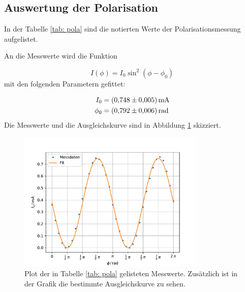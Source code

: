 \subsection{Auswertung der Polarisation}

In der Tabelle \ref{tab: pola} sind die notierten Werte der Polarisationsmessung
aufgelistet.
\FloatBarrier

An die Messwerte wird die Funktion

\begin{equation}
  \label{eq: func_polarisation}
  I(\phi)=I_0\sin^2\left(\phi-\phi_0\right)
\end{equation}
mit den folgenden Parametern gefittet:

\begin{align}
  \label{eq: fit_pola}
  \begin{aligned}
  I_0&=\SI{0.748\pm0.005}{\milli\ampere}\\
  \phi_0&=\SI{0.792\pm0.006}{\radian}
\end{aligned}
\end{align}
Die Messwerte und die Ausgleichskurve sind in Abbildung \ref{fig: pola} skizziert.

\begin{figure}[h!]
  \centering
  \includegraphics[width=0.8\textwidth]{../Messdaten/plots/pola.pdf}
  \caption{Plot der in Tabelle \ref{tab: pola} gelisteten Messwerte. Zusätzlich ist in der Grafik die bestimmte Ausgleichskurve zu sehen.}
  \label{fig: pola}
\end{figure}
\FloatBarrier

\FloatBarrier
